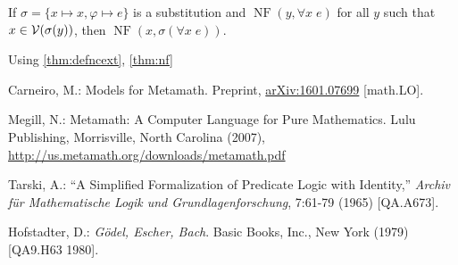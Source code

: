 \documentclass[runningheads,a4paper]{llncs}
\newcommand{\vph}{\varphi}
\DeclareMathOperator{\NF}{NF}
\begin{document}
If $\sigma=\{x\mapsto x, \vph\mapsto e\}$ is a substitution and $\NF(y,\forall x\; e)$ for all $y$ such that $x\in{\cal V}(\sigma(y))$, then $\NF(x,\sigma(\forall x\; e))$.

Using \autoref{thm:defncext}, \autoref{thm:nf}

\begin{thebibliography}{4}

 Carneiro, M.: Models for Metamath. Preprint,	\href{http://arxiv.org/abs/1601.07699}{arXiv:1601.07699} [math.LO].

 Megill, N.: Metamath: A Computer Language for Pure Mathematics. Lulu Publishing, Morrisville, North Carolina (2007), \url{http://us.metamath.org/downloads/metamath.pdf}

 Tarski, A.: ``A Simplified Formalization of Predicate Logic with Identity,'' {\em Archiv f\"{u}r Mathematische Logik und Grundlagenforschung}, 7:61-79 (1965) [QA.A673].

 Hofstadter, D.: {\em G\"{o}del, Escher, Bach}. Basic Books, Inc., New York (1979) [QA9.H63 1980].
\end{thebibliography}
\end{document}

